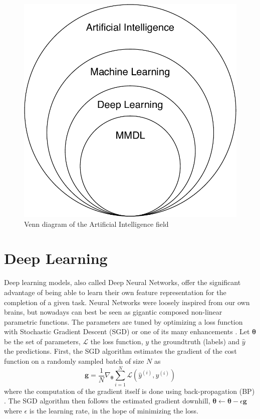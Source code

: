 \begin{figure}[!ht]
\centering
\includegraphics[scale=0.45]{figures/venn}
\caption{Venn diagram of the Artificial Intelligence field}	
\label{fig:venn-diagram}
\end{figure}


\section{Deep Learning}
Deep learning models, also called Deep Neural Networks, offer the significant advantage of being able to learn their own feature representation for the completion of a given task. Neural Networks were loosely inspired from our own brains, but nowadays can best be seen as gigantic composed non-linear parametric functions. The parameters are tuned by optimizing a loss function with Stochastic Gradient Descent (SGD) or one of its many enhancements \citep{optim-algos}. Let $\bm{\theta}$ be the set of parameters, $\mathcal{L}$ the loss function, $y$ the groundtruth (labels) and $\hat{y}$ the predictions. First, the SGD algorithm estimates the gradient of the cost function on a randomly sampled batch of size $N$ as
\begin{equation}
\mathbf{g} = \frac{1}{N}\nabla_{\bm{\theta}}\sum_{i=1}^N\mathcal{L}(\hat{y}^{(i)},y^{(i)})
\end{equation}
where the computation of the gradient itself is done using back-propagation (BP) \citep{backprop}. The SGD algorithm then follows the estimated gradient downhill, $\bm{\theta} \leftarrow \bm{\theta} - \epsilon\mathbf{g}$ where $\epsilon$ is the learning rate, in the hope of minimizing the loss.


